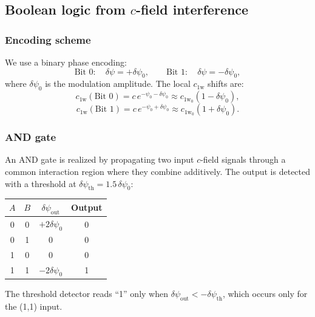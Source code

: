 \documentclass[aps,prd,twocolumn,superscriptaddress,nofootinbib,floatfix]{revtex4-2}
\newcommand{\psifield}{\psi}
\newcommand{\cfield}{c_{\text{1w}}}
\newcommand{\cvac}{c}
\begin{document}
\subsection{Boolean logic from $c$-field interference}
\label{subsec:boolean}

\subsubsection{Encoding scheme}

We use a binary phase encoding:
\begin{equation}
\text{Bit 0}: \quad \delta\psifield = +\delta\psifield_0, \qquad
\text{Bit 1}: \quad \delta\psifield = -\delta\psifield_0,
\label{eq:binary_encoding}
\end{equation}
where $\delta\psifield_0$ is the modulation amplitude. The local
$\cfield$ shifts are:
\begin{equation}
\cfield(\text{Bit 0}) = \cvac\,e^{-\psifield_0 - \delta\psifield_0}
\approx \cfield_0(1 - \delta\psifield_0),
\label{eq:c_bit0}
\end{equation}
\begin{equation}
\cfield(\text{Bit 1}) = \cvac\,e^{-\psifield_0 + \delta\psifield_0}
\approx \cfield_0(1 + \delta\psifield_0).
\label{eq:c_bit1}
\end{equation}

\subsubsection{AND gate}

An AND gate is realized by propagating two input $c$-field signals
through a common interaction region where they combine additively.
The output is detected with a threshold at
$\delta\psifield_{\text{th}} = 1.5\,\delta\psifield_0$:

\begin{center}
\begin{tabular}{cc|c|c}
$A$ & $B$ & $\delta\psifield_{\text{out}}$ & Output \\
\hline
0 & 0 & $+2\delta\psifield_0$ & 0 \\
0 & 1 & $0$ & 0 \\
1 & 0 & $0$ & 0 \\
1 & 1 & $-2\delta\psifield_0$ & 1 \\
\end{tabular}
\end{center}

The threshold detector reads ``1'' only when
$\delta\psifield_{\text{out}} < -\delta\psifield_{\text{th}}$,
which occurs only for the (1,1) input.
\end{document}
